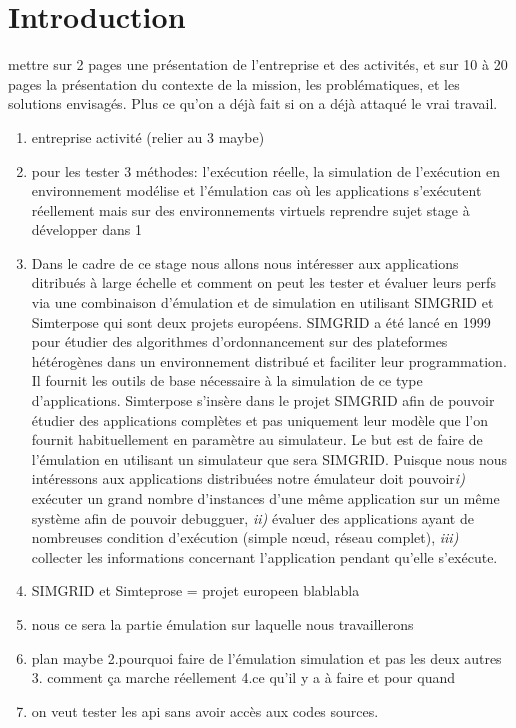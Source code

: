 \section{Introduction}
mettre sur 2 pages une présentation de l'entreprise et des activités, et sur 10 à 20 pages la présentation du contexte de la mission, les problématiques, et les solutions envisagés. Plus ce qu'on a déjà fait si on a déjà attaqué le vrai travail.
\begin{enumerate}
\item entreprise activité (relier au 3 maybe)
\item pour les tester 3 méthodes: l'exécution réelle, la simulation de l'exécution en environnement modélise et l'émulation cas où les applications s'exécutent réellement mais sur des environnements virtuels {\color{red} reprendre sujet stage à développer dans 1} 
\item Dans le cadre de ce stage nous allons nous intéresser aux applications ditribués à large échelle et comment on peut les tester et évaluer leurs perfs via une combinaison d'émulation et de simulation en utilisant SIMGRID et Simterpose qui sont deux projets européens. SIMGRID a été lancé en 1999 pour étudier des algorithmes d'ordonnancement sur des plateformes hétérogènes dans un environnement distribué et faciliter leur programmation. Il fournit les outils de base nécessaire à la simulation de ce type d'applications. Simterpose s'insère dans le projet SIMGRID afin de pouvoir étudier des applications complètes et pas uniquement leur modèle que l'on fournit habituellement en paramètre au simulateur. Le but est de faire de l'émulation en utilisant un simulateur que sera SIMGRID. Puisque nous nous intéressons aux applications distribuées notre émulateur doit pouvoir\textit{i)} exécuter un grand nombre d'instances d'une même application sur un même système afin de pouvoir debugguer, \textit{ii)} évaluer des applications ayant de nombreuses condition d'exécution (simple n\oe ud, réseau complet), \textit{iii)} collecter les informations concernant l'application pendant qu'elle s'exécute.
\item SIMGRID et Simteprose = projet europeen blablabla
\item nous ce sera la partie émulation sur laquelle nous travaillerons
\item plan maybe 2.pourquoi faire de l'émulation simulation et pas les deux autres 3. comment ça marche réellement 4.ce qu'il y a à faire et pour quand
\item on veut tester les api sans avoir accès aux codes sources.
\end{enumerate}
